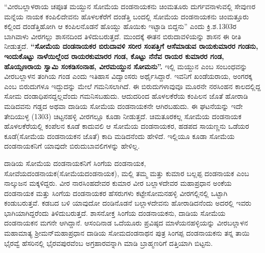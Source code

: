 “ವೀರಬಲ್ಲಾಳರಾಯ ಚಪೂತ ಮಯ್ದುನ ಸೋಮೆಯ ದಂಡನಾಯಕನು ಚಿಂಮತೂರು ದುರ್ಗವನಾಳುವಲ್ಲಿ ಸೇವುಣರ ಮನ್ನೆಯ ನಾಯಕ ಕಂಪಿಲಿದೇವನು ಹೊಳಲಕೆರೆಗೆ ದಂಡೆತ್ತಿ ಬಂದಲ್ಲಿ ಸೋಮೆಯ ದಂಡನಾಯಕನು ಚಿಂಮತ್ತೂರು ಕಲ್ಲಿಂದ ದಂಡೆತ್ತಿಹೋಗಿ ಆ ಕಂಪಿಲನೊಡನೆ ಹೊಯ್ದು ಹೊಯಿಕು ಇಟ್ಟಾಡಿ ಬಿದ್ದನು” ಎಂದು ಕ್ರಿ.ಶ.1303ರ ಬಾಗಿವಾಳು ವೀರಗಲ್ಲು ಶಾಸನದಿಂದ ತಿಳಿದುಬರುತ್ತದೆ. ಮುಂದಕ್ಕೆ ಈತನ ಬಿರುದಾವಳಿಯನ್ನು ಶಾಸನ ಈ ರೀತಿ ನೀಡುತ್ತದೆ. \textbf{“ಸೋಮೆಯ ದಂಡನಾಯಕರ ಬಿರುದಾವಳಿ ಸರೀರ ಸಂಪತ್ತಿಗೆ ಆಸೆಮಾಡುವ ರಾಯಕುಮಾರರ ಗಂಡನು, ಇಂದುಕೊಟ್ಟು ನಾಳೆಯಿಲ್ಲೆಂದ ರಾಯರಕುಮಾರರ ಗಂಡ, ಕೊಟ್ಟು ನೆನೆವ ರಾಯರ ಕುಮಾರರ ಗಂಡ, ಹೊಯ್ಸಣರಾಯ ಸ್ವಾಮಿ ಸಂಕಡಿಸಂನಾಹ,\general{\break } ವೀರಮಯ್ದುನ ಸೋಮನು”.} ಇಲ್ಲಿ ಮಯ್ದುನ ಎಂಬ ಸಂಬಂಧವನ್ನು ವೀರಬಲ್ಲಾಳನ ತಂಗಿಯ ಗಂಡ ಎಂದು ಇತಿಹಾಸ ವಿದ್ವಾಂಸರು ಅರ್ಥೈಸಿದ್ದಾರೆ. ಇವನಿಗೆ ಖಂಡೆಯರಾಯ, ಅಂಗರಕ್ಕ ಎಂಬ ಬಿರುದುಗಳೂ ಇದ್ದುದನ್ನು ಮೇಲೆ ಗಮನಿಸಲಾಗಿದೆ. ಈ ಬಿರುದುಗಳಾವುವೂ ಮೂರನೇ ನರಸಿಂಹನ ಕಾಲದಲ್ಲಿದ್ದ ಸೋಮ ದಂಡಾಧಿಪನದ್ದಲ್ಲವೆಂದು ಗಮನಿಸಬಹುದು. ಆದುದರಿಂದ ಹೊಳಲಕೆರೆಯ ಕಂಪಿಲನ ಜೊತೆ ಹೋರಾಡಿ ಮಡಿದವನು ಗಡ್ಡದ ಅಥವಾ ದಾಡಿಯ ಸೋಮೆಯ ದಂಡನಾಯಕನೇ ಆಗಿರಬಹುದು. ಈ ಘಟನೆಯನ್ನು ಇದೇ ತೇದಿಯುಳ್ಳ (1303) ಚಿಟ್ಟನಹಳ್ಳಿ ವೀರಗಲ್ಲೂ ಕೂಡಾ ನೀಡುತ್ತದೆ. ಚಿಮತೂರಕಲ್ಲ ಸೋಮೆಯ ದಂಡನಾಯಕ ಹೊಳಲಕೆರೆಯಲ್ಲಿ ಕಂಪೆಲನ ಕೂಡೆ ಕಾದುವಲಿ ಆ ಸೋಮೆಯ ದಂಡನಾಯಕರ, ಹಡಪದ ಸಾಯಣ್ಣನು ಒಡೆಯರ ಕೂಡೆ(ಸೋಮೆಯ ದಂಡನಾಯಕನ ಜೊತೆ) ಕಾದಿ ಮಡಿದನೆಂದು ಹೇಳಿದೆ. ಇಲ್ಲಿಯೂ ಕೂಡಾ ಸೋಮೆಯ ದಂಡನಾಯಕನಿಗೆ ಯಾವುದೇ ಬಿರುದುಬಾವಲಿಗಳನ್ನು ಹೇಳಿಲ್ಲ.

\newpage

ದಾಡಿಯ ಸೋಮೆಯ ದಂಡನಾಯಕನಿಗೆ ಸಿಂಗೆಯ ದಂಡನಾಯಕ, ಸೋವೆಯದಂಡನಾಯಕ(ಸೋಮೆಯ\break ದಂಡನಾಯಕ), ಮಲ್ಲಿ ತಮ್ಮ ಮತ್ತು ಕುಮಾರ ಬಲ್ಲಪ್ಪ ದಂಡನಾಯಕ ಎಂಬ ನಾಲ್ಕುಜನ ಮಕ್ಕಳಿದ್ದರು. ವೀರ ನಾರಸಿಂಹದೇವರ ಕುಮಾರ ವೀರ ಬಲ್ಲಾಳದೇವರ ಮಹಾಪ್ರಧಾನ ಅಂಕೆಯ ದಂಡನಾಯಕ ಮತ್ತು ಸಿಂಗೆಯ ದಂಡನಾಯಕರ ಹೆಸರುಗಳು ಕಟ್ಟೇಸೋಮನಹಳ್ಳಿ ವೀರಗಲ್ಲಿನಲ್ಲಿ ಒಟ್ಟಾಗಿ ಕಂಡುಬರುತ್ತವೆ. ಕಡಬದ ಬಳಿ ಯಾವುದೋ ದಂಡಿನೊಡನೆ ಬಲ್ಲಾಳದೇವನು ಹೋರಾಡಿದನೆಂದು ಅದರಲ್ಲಿ ಇವರು ಭಾಗಿಯಾಗಿದ್ದರೆಂದು ತಿಳಿದುಬರುತ್ತದೆ. ಶಾಸನೋಕ್ತ ಸಿಂಗೆಯ ದಂಡನಾಯಕನು, ದಾಡಿಯ ಸೋಮೆಯ ದಂಡನಾಯಕನ ಮಗನೇ ಆಗಿದ್ದಾನೆ. ಆಸಂದಿನಾಡ ಒದೆಯೂರು ಪ್ರವಿಷ್ಠದ ಮಾಳೆಯನಹಳ್ಳಿಯನ್ನು ವೀರಬಲ್ಲಾಳನ ಮಹಾಮಾತ್ಯ ಶ‍್ರೀಮನ್​ಮಹಾಪ್ರಧಾನ ದಾಡಿಯ ಸೋಮದಂಡನಾಥನ ಪುತ್ರ ಸಿಂಗಪ್ಪ ದಂಡನಾಯಕನು ತನ್ನ ತಾಯಿ ಭೈರವ್ವೆ ಹೆಸರಿನಲ್ಲಿ ಭೈರವಪುರವೆಂಬ ಅಗ್ರಹಾರವನ್ನಾಗಿ ಮಾಡಿ ಬ್ರಾಹ್ಮಣರಿಗೆ ದತ್ತಿಯಾಗಿ ಬಿಟ್ಟನು.

